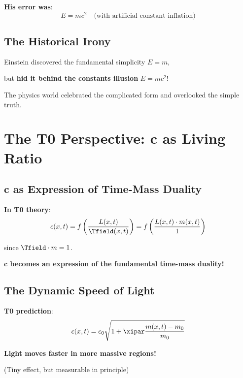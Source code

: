 	\textbf{His error was}:
	\begin{equation}
		E = mc^2 \quad \text{(with artificial constant inflation)}
	\end{equation}
	
	\subsection{The Historical Irony}
	
	\begin{tcolorbox}[colback=blue!5!white,colframe=blue!75!black,title=The Great Irony]
		Einstein discovered the fundamental simplicity $E = m$, 
		
		but \textbf{hid it behind the constants illusion} $E = mc^2$!
		
		The physics world celebrated the complicated form and overlooked the simple truth.
	\end{tcolorbox}
	
	\section{The T0 Perspective: c as Living Ratio}
	
	\subsection{c as Expression of Time-Mass Duality}
	
	\textbf{In T0 theory}:
	\begin{equation}
		c(x,t) = f\left(\frac{L(x,t)}{\Tfield(x,t)}\right) = f\left(\frac{L(x,t) \cdot m(x,t)}{1}\right)
	\end{equation}
	
	since $\Tfield \cdot m = 1$.
	
	\textbf{c becomes an expression of the fundamental time-mass duality!}
	
	\subsection{The Dynamic Speed of Light}
	
	\textbf{T0 prediction}: 
	\begin{equation}
		c(x,t) = c_0 \sqrt{1 + \xipar \frac{m(x,t) - m_0}{m_0}}
	\end{equation}
	
	\textbf{Light moves faster in more massive regions!}
	
	(Tiny effect, but measurable in principle)
	
